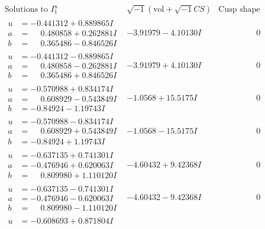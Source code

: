 \documentclass[1p]{elsarticle_modified}
\theoremstyle{definition}
\newcommand{\I}{\sqrt{-1}}
\begin{document}
$$\begin{array}{c|c|c}  
\text{Solutions to }I^u_{1}& \I (\text{vol} + \sqrt{-1}CS) & \text{Cusp shape}\\
 \hline 
\begin{aligned}
u &= -0.441312 + 0.889865 I \\
a &= \phantom{-}0.480858 + 0.262881 I \\
b &= \phantom{-}0.365486 - 0.846526 I\end{aligned}
 & -3.91979 - 4.10130 I & \phantom{-0.000000 } 0 \\ \hline\begin{aligned}
u &= -0.441312 - 0.889865 I \\
a &= \phantom{-}0.480858 - 0.262881 I \\
b &= \phantom{-}0.365486 + 0.846526 I\end{aligned}
 & -3.91979 + 4.10130 I & \phantom{-0.000000 } 0 \\ \hline\begin{aligned}
u &= -0.570988 + 0.834174 I \\
a &= \phantom{-}0.608929 - 0.543849 I \\
b &= -0.84924 - 1.19743 I\end{aligned}
 & -1.0568 + 15.5175 I & \phantom{-0.000000 } 0 \\ \hline\begin{aligned}
u &= -0.570988 - 0.834174 I \\
a &= \phantom{-}0.608929 + 0.543849 I \\
b &= -0.84924 + 1.19743 I\end{aligned}
 & -1.0568 - 15.5175 I & \phantom{-0.000000 } 0 \\ \hline\begin{aligned}
u &= -0.637135 + 0.741301 I \\
a &= -0.476946 + 0.620063 I \\
b &= \phantom{-}0.809980 + 1.110120 I\end{aligned}
 & -4.60432 + 9.42368 I & \phantom{-0.000000 } 0 \\ \hline\begin{aligned}
u &= -0.637135 - 0.741301 I \\
a &= -0.476946 - 0.620063 I \\
b &= \phantom{-}0.809980 - 1.110120 I\end{aligned}
 & -4.60432 - 9.42368 I & \phantom{-0.000000 } 0 \\ \hline\begin{aligned}
u &= -0.608693 + 0.871804 I \\

\end{aligned}
\end{array}$$
\end{document}
